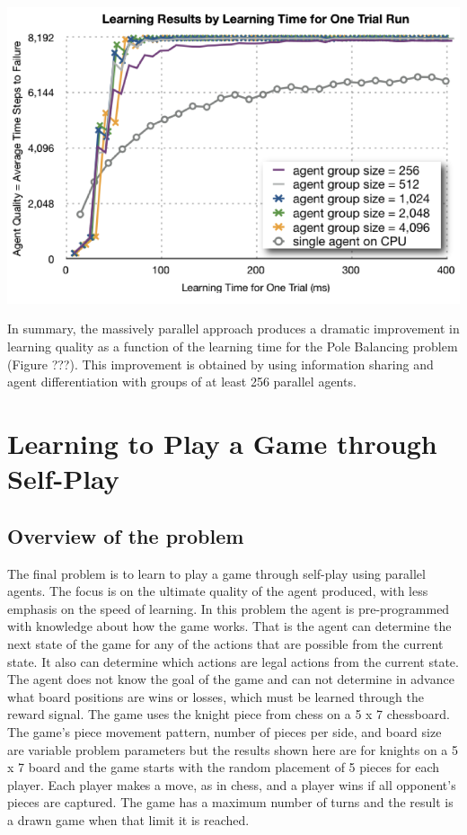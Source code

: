 \documentclass[11pt]{article} %
\begin{document}
\includegraphics[scale=0.8]{fig10}
\begin{flushleft}

In summary, the massively parallel approach produces a dramatic improvement in learning quality as a function of the learning time for the Pole Balancing problem (Figure ???).  This improvement is obtained by using information sharing and agent differentiation with groups of at least 256 parallel agents. 


\section{Learning to Play a Game through Self-Play}
\subsection{Overview of the problem}
The final problem is to learn to play a game through self-play using parallel agents.  The focus is on the ultimate quality of the agent produced, with less emphasis on the speed of learning.  In this problem the agent is pre-programmed with knowledge about how the game works.  That is the agent can determine the next state of the game for any of the actions that are possible from the current state.  It also can determine which actions are legal actions from the current state.  The agent does not know the goal of the game and can not determine in advance what board positions are wins or losses, which must be learned through the reward signal.  The game uses the knight piece from chess on a 5 x 7 chessboard.  The game’s piece movement pattern, number of pieces per side, and board size are variable problem parameters but the results shown here are for knights on a 5 x 7 board and the game starts with the random placement of 5 pieces for each player.  Each player makes a move, as in chess, and a player wins if all opponent’s pieces are captured.  The game has a maximum number of turns and the result is a drawn game when that limit it is reached.


\end{flushleft}
\end{document}
